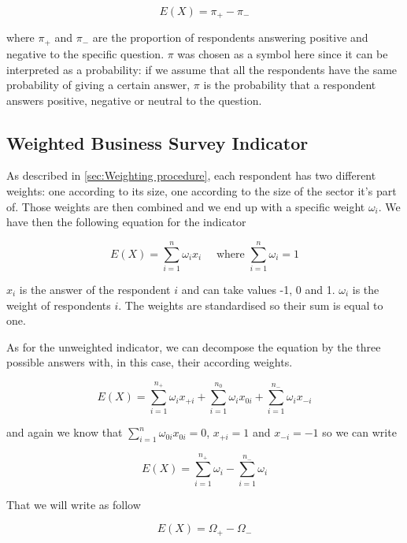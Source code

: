 \documentclass[12pt,a4paper,oneside]{book}
\begin{document}
\begin{equation}
    E(X) = \pi_+ - \pi_-  \label{eq: BSI Unweighted}
\end{equation}

where $\pi_+$ and $\pi_-$ are the proportion of respondents answering positive and negative to the specific question.
$\pi$ was chosen as a symbol here since it can be interpreted as a probability: if we assume that all the respondents have the same probability of giving a certain answer, $\pi$ is the probability that a respondent answers positive, negative or neutral to the question. 


\subsection{Weighted Business Survey Indicator}

As described in \autoref{sec:Weighting procedure}, each respondent has two different weights: one according to its size, one according to the size of the sector it's part of. Those weights are then combined and we end up with a specific weight $\omega_i$.
We have then the following equation for the indicator

\begin{equation}
    E(X) = \sum_{i=1}^n \omega_i x_i  \quad \text{  where  } \sum_{i=1}^n \omega_i =  1
\end{equation} 

$x_i$ is the answer of the respondent $i$ and can take values -1, 0 and 1.
$\omega_i$ is the weight of respondents $i$. 
The weights are standardised so their sum is equal to one.

As for the unweighted indicator, we can decompose the equation by the three possible answers with, in this case, their according weights.

\begin{equation}
    E(X) = \sum_{i=1}^{n_+} \omega_{i} x_{+i} + \sum_{i=1}^{n_0} \omega_{i} x_{0i} + \sum_{i=1}^{n_-} \omega_{i} x_{-i}
 \end{equation}

and again we know that $\sum_{i=1}^n \omega_{0i} x_{0i} = 0$, $x_{+i} = 1$ and $x_{-i}=-1$ so we can write

\begin{equation}
    E(X) = \sum_{i=1}^{n_+} \omega_{i}  - \sum_{i=1}^{n_-} \omega_{i}
\end{equation}

That we will write as follow

\begin{equation}
    E(X) = \Omega_+ - \Omega_- \label{eq: BSI Weighted}
\end{equation}
\end{document}

